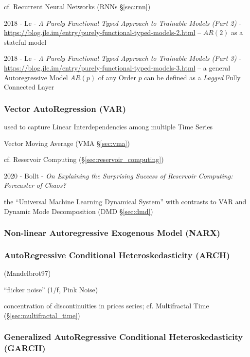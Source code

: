 \fist cf. Recurrent Neural Networks (RNNs \S\ref{sec:rnn})

2018 - Le -
\emph{A Purely Functional Typed Approach to Trainable Models (Part 2)} -
\url{https://blog.jle.im/entry/purely-functional-typed-models-2.html}
-- $AR(2)$ as a stateful model

2018 - Le -
\emph{A Purely Functional Typed Approach to Trainable Models (Part 3)} -
\url{https://blog.jle.im/entry/purely-functional-typed-models-3.html}
-- a general Autoregressive Model $AR(p)$ of any Order $p$ can be defined as a
\emph{Lagged} Fully Connected Layer




\subsubsection{Vector AutoRegression (VAR)}\label{sec:var}

used to capture Linear Interdependencies among multiple Time Series

Vector Moving Average (VMA \S\ref{sec:vma})

cf. Reservoir Computing (\S\ref{sec:reservoir_computing})

2020 - Bollt - \emph{On Explaining the Surprising Success of Reservoir
  Computing: Forecaster of Chaos?}

the ``Universal Machine Learning Dynamical System'' with contrasts to VAR and
Dynamic Mode Decomposition (DMD \S\ref{sec:dmd})



\subsubsection{Non-linear Autoregressive Exogenous Model (NARX)}\label{sec:narx}

\subsubsection{AutoRegressive Conditional Heteroskedasticity (ARCH)}
\label{sec:arch}

(Mandelbrot97)

``flicker noise'' (1/f, Pink Noise)

concentration of discontinuities in prices series; cf. Multifractal Time
(\S\ref{sec:multifractal_time})



\subsubsection{Generalized AutoRegressive Conditional Heteroskedasticity (GARCH)}
\label{sec:garch}



